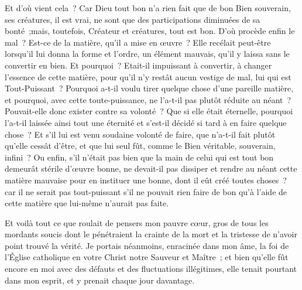 \documentclass[french,twoside]{book} %
\begin{document}
Et d’où vient cela ? Car Dieu tout bon n’a rien fait que de bon Bien souverain, ses créatures, il est vrai, ne sont que des participations diminuées de sa bonté ;mais, toutefois, Créateur et créatures, tout est bon. D’où procède enfin le mal ? Est-ce de la matière, qu’il a mise en œuvre ? Elle recélait peut-être   lorsqu’il lui donna la forme et l’ordre, un élément mauvais, qu’il y laissa sans le convertir en bien. Et pourquoi ? Etait-il impuissant à convertir, à changer l’essence de cette matière, pour qu’il n’y restât aucun vestige de mal, lui qui est Tout-Puissant ? Pourquoi a-t-il voulu tirer quelque chose d’une pareille matière, et pourquoi, avec cette toute-puissance, ne l’a-t-il pas plutôt réduite au néant ? Pouvait-elle donc exister contre sa volonté ? Que si elle était éternelle, pourquoi l’a-t-il laissée ainsi tout une éternité et s’est-il décidé si tard à en faire quelque chose ? Et s’il lui est venu soudaine volonté de faire, que n’a-t-il fait plutôt qu’elle cessât d’être, et que lui seul fût, comme le Bien véritable, souverain, infini ? Ou enfin, s’il n’était pas bien que la main de celui qui est tout bon demeurât stérile d’œuvre bonne, ne devait-il pas dissiper et rendre au néant cette matière mauvaise pour en instituer une bonne, dont il eût créé toutes choses ? car il ne serait pas tout-puissant s’il ne pouvait rien faire de bon qu’à l’aide de cette matière que lui-même n’aurait pas faite.\par
Et voilà tout ce que roulait de pensers mon pauvre cœur, gros de tous les mordants soucis dont le pénétraient la crainte de la mort et la tristesse de n’avoir point trouvé la vérité. Je portais néanmoins, enracinée dans mon âme, la foi de l’Église catholique en votre Christ notre Sauveur et Maître ; et bien qu’elle fût encore en moi avec des défauts et des fluctuations illégitimes, elle tenait pourtant dans mon esprit, et y prenait chaque jour davantage.
\end{document}
